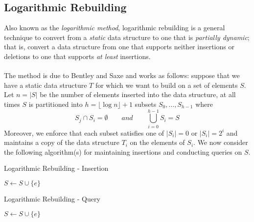 \subsection*{Logarithmic Rebuilding}

Also known as the \textit{logarithmic method}, logarithmic rebuilding is a general technique to convert from a \textit{static} data structure to one that is \textit{partially dynamic}; that is, convert a data structure from one that supports neither insertions or deletions to one that supports \textit{at least} insertions. \\
\\
The method is due to Bentley and Saxe \cite{BENTLEY} and works as follows: suppose that we have a static data structure $T$ for which we want to build on a set of elements $S$.  Let $n = |S|$ be the number of elements inserted into the data structure, at all times $S$ is partitioned into $h = \lfloor \log n\rfloor+1$ subsets $S_0, \dots, S_{h-1}$ where 
$$S_j \cap S_i = \emptyset \quad \quad  and \quad \quad \bigcup_{i=0}^{h-1}S_i = S$$ 
Moreover, we enforce that each subset satisfies one of $|S_i| = 0$ or $|S_i| = 2^i$ and maintains a copy of the data structure $T_i$ on the elements of $S_i$. We now consider the following algorithm(s) for maintaining insertions and conducting queries on $S$. 

\begin{algorithm}
\caption{Logarithmic Rebuilding - Insertion}
\begin{algorithmic}
    \State $S\gets S \cup \{e\}$
\end{algorithmic}
\end{algorithm}


\begin{algorithm}
\caption{Logarithmic Rebuilding - Query}
\begin{algorithmic}
    \State $S\gets S \cup \{e\}$
\end{algorithmic}
\end{algorithm}